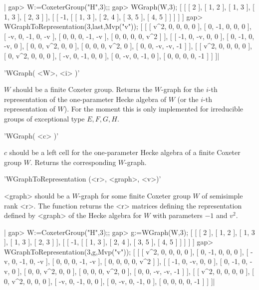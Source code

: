 |    gap> W:=CoxeterGroup("H",3);;
    gap> WGraph(W,3);
    [ [ [ 2 ], [ 1, 2 ], [ 1, 3 ], [ 1, 3 ], [ 2, 3 ] ],
      [ [ -1, [ [ 1, 3 ], [ 2, 4 ], [ 3, 5 ], [ 4, 5 ] ] ] ] ]
    gap> WGraphToRepresentation(3,last,Mvp("v"));
    [ [ [ v^2, 0, 0, 0, 0 ], [ 0, -1, 0, 0, 0 ], [ -v, 0, -1, 0, -v ],
          [ 0, 0, 0, -1, -v ], [ 0, 0, 0, 0, v^2 ] ],
      [ [ -1, 0, -v, 0, 0 ], [ 0, -1, 0, -v, 0 ], [ 0, 0, v^2, 0, 0 ],
          [ 0, 0, 0, v^2, 0 ], [ 0, 0, -v, -v, -1 ] ],
      [ [ v^2, 0, 0, 0, 0 ], [ 0, v^2, 0, 0, 0 ], [ -v, 0, -1, 0, 0 ],
          [ 0, -v, 0, -1, 0 ], [ 0, 0, 0, 0, -1 ] ] ]|


'WGraph( <W>, <i> )'

$W$  should be a finite Coxeter group. Returns the $W$-graph for the $i$-th
representation  of the  one-parameter Hecke  algebra of  $W$ (or the $i$-th
representation  of  $W$).  For  the  moment  this  is  only implemented for
irreducible groups of exceptional type $E, F, G, H$.

'WGraph( <c> )'

$c$  should be a left cell for  the one-parameter Hecke algebra of a finite
Coxeter group $W$. Returns the corresponding $W$-graph.


'WGraphToRepresentation (<r>, <graph>, <v>)'

<graph>  should  be  a  $W$-graph  for  some  finite  Coxeter  group $W$ of
semisimple  rank <r>.  The function  returns the  <r> matrices defining the
representation  defined  by  <graph>  of  the  Hecke  algebra  for $W$ with
parameters $-1$ and $v^2$.

|    gap> W:=CoxeterGroup("H",3);;
    gap> g:=WGraph(W,3);
    [ [ [ 2 ], [ 1, 2 ], [ 1, 3 ], [ 1, 3 ], [ 2, 3 ] ],
      [ [ -1, [ [ 1, 3 ], [ 2, 4 ], [ 3, 5 ], [ 4, 5 ] ] ] ] ]
    gap> WGraphToRepresentation(3,g,Mvp("v"));
    [ [ [ v^2, 0, 0, 0, 0 ], [ 0, -1, 0, 0, 0 ], [ -v, 0, -1, 0, -v ],
          [ 0, 0, 0, -1, -v ], [ 0, 0, 0, 0, v^2 ] ],
      [ [ -1, 0, -v, 0, 0 ], [ 0, -1, 0, -v, 0 ], [ 0, 0, v^2, 0, 0 ],
          [ 0, 0, 0, v^2, 0 ], [ 0, 0, -v, -v, -1 ] ],
      [ [ v^2, 0, 0, 0, 0 ], [ 0, v^2, 0, 0, 0 ], [ -v, 0, -1, 0, 0 ],
          [ 0, -v, 0, -1, 0 ], [ 0, 0, 0, 0, -1 ] ] ]|

